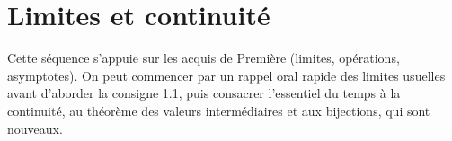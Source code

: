 \section{Limites et continuité}
\begin{noteprof}
Cette séquence s'appuie sur les acquis de Première (limites, opérations, asymptotes). On peut commencer par un rappel oral rapide des limites usuelles avant d'aborder la consigne 1.1, puis consacrer l'essentiel du temps à la continuité, au théorème des valeurs intermédiaires et aux bijections, qui sont nouveaux.
\end{noteprof}
\ifenseignant %

